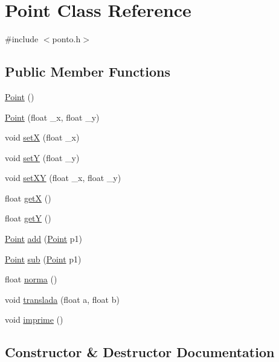 \hypertarget{class_point}{}\section{Point Class Reference}
\label{class_point}


{\ttfamily \#include $<$ponto.\+h$>$}

\subsection*{Public Member Functions}
\begin{DoxyCompactItemize}
\item 
\hyperlink{class_point_ad92f2337b839a94ce97dcdb439b4325a}{Point} ()
\item 
\hyperlink{class_point_a6524332fa4d321ff0a001366a732c7b6}{Point} (float \+\_\+x, float \+\_\+y)
\item 
void \hyperlink{class_point_a428a1676e2fdec6753c42011a1d59d18}{setX} (float \+\_\+x)
\item 
void \hyperlink{class_point_a9868c4601b0ea0c2d0de20fe41ee0e49}{setY} (float \+\_\+y)
\item 
void \hyperlink{class_point_ab5385c6d9bfa841e641e4709fc9f14cc}{set\+XY} (float \+\_\+x, float \+\_\+y)
\item 
float \hyperlink{class_point_acc27466778cc87a662bba40268c4c0c8}{getX} ()
\item 
float \hyperlink{class_point_a3cccbca94719ddde353cce86ce0e2f64}{getY} ()
\item 
\hyperlink{class_point}{Point} \hyperlink{class_point_a9dbea84b07b0a8ec3bbb9e58b3d15899}{add} (\hyperlink{class_point}{Point} p1)
\item 
\hyperlink{class_point}{Point} \hyperlink{class_point_a9cf2c53b0a4e6282a6712824bb4e9b00}{sub} (\hyperlink{class_point}{Point} p1)
\item 
float \hyperlink{class_point_abd2618d1f505d9392893273a66e7c9b2}{norma} ()
\item 
void \hyperlink{class_point_ad9676e36f3444534b609e3c68422239a}{translada} (float a, float b)
\item 
void \hyperlink{class_point_a1fb5c2501c27ab2cbc99d06c2a26a741}{imprime} ()
\end{DoxyCompactItemize}


\subsection{Constructor \& Destructor Documentation}
\mbox{\label{class_point_ad92f2337b839a94ce97dcdb439b4325a}} 
